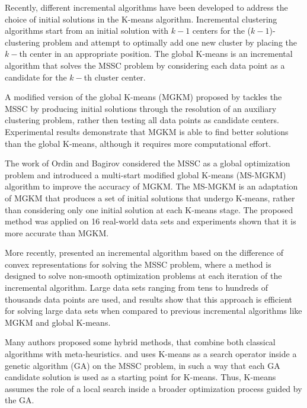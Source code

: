 Recently, different incremental algorithms have been developed to address the choice of initial solutions in the K-means algorithm. Incremental clustering algorithms start from an initial solution with $k - 1$ centers for the ($k - 1$)-clustering problem and attempt to optimally add one new cluster by placing the $k-$th center in an appropriate position. The global K-means \cite{Likas2003} is an incremental algorithm that solves the MSSC problem by considering each data point as a candidate for the $k-$th cluster center.

A modified version of the global K-means (MGKM) proposed by \cite{Bagirov2008} tackles the MSSC by producing initial solutions through the resolution of an auxiliary clustering problem, rather then testing all data points as candidate centers. Experimental results demonstrate that MGKM is able to find better solutions than the global K-means, although it requires more computational effort.
 
The work of Ordin and Bagirov \cite{Ordin2014} considered the MSSC as a global optimization problem and introduced a multi-start modified global K-means (MS-MGKM) algorithm to improve the accuracy of MGKM. The MS-MGKM is an adaptation of MGKM that produces a set of initial solutions that undergo K-means, rather than considering only one initial solution at each K-means stage. The proposed method was applied on 16 real-world data sets and experiments shown that it is more accurate than MGKM.

More recently, \cite{Bagirov2016} presented an incremental algorithm based on the difference of convex representations for solving the MSSC problem, where a method is designed to solve non-smooth optimization problems at each iteration of the incremental algorithm. Large data sets ranging from tens to hundreds of thousands data points are used, and results show that this approach is efficient for solving large data sets when compared to previous incremental algorithms like MGKM and global K-means.

Many authors proposed some hybrid methods, that combine both classical algorithms with meta-heuristics. \cite{Krishna1999} and \cite{Lu2004} uses K-means as a search operator inside a genetic algorithm (GA) on the MSSC problem, in such a way that each GA candidate solution is used as a starting point for K-means. Thus, K-means assumes the role of a local search inside a broader optimization process guided by the GA.

